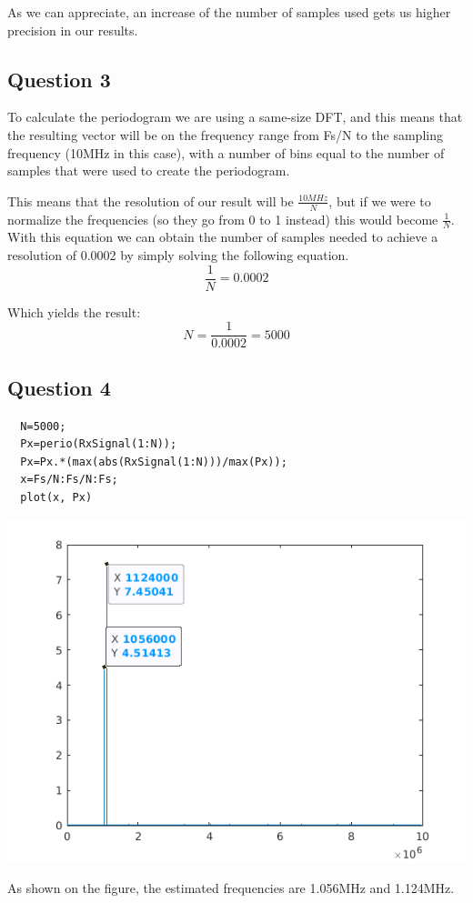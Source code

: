 \documentclass[conference,9pt]{IEEEtran}
\begin{document}
As we can appreciate, an increase of the number of samples used gets us higher precision in our results.

\subsection{Question 3}
To calculate the periodogram we are using a same-size DFT, and this means that the resulting vector will be on the frequency range from Fs/N to the sampling frequency (10MHz in this case), with a number of bins equal to the number of samples that were used to create the periodogram.

This means that the resolution of our result will be $\frac{10MHz}{N}$, but if we were to normalize the frequencies (so they go from 0 to 1 instead) this would become $\frac{1}{N}$. With this equation we can obtain the number of samples needed to achieve a resolution of 0.0002 by simply solving the following equation.
$$\frac{1}{N}=0.0002$$

Which yields the result:
$$N=\frac{1}{0.0002}=5000$$

\subsection{Question 4}
\begin{verbatim}
  N=5000;
  Px=perio(RxSignal(1:N));
  Px=Px.*(max(abs(RxSignal(1:N)))/max(Px));
  x=Fs/N:Fs/N:Fs;
  plot(x, Px)
\end{verbatim}

\includegraphics[scale=0.6]{q4}

As shown on the figure, the estimated frequencies are 1.056MHz and 1.124MHz.
\end{document}
